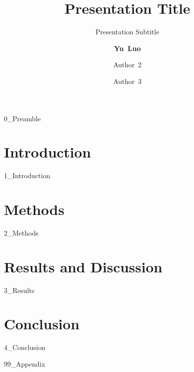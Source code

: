\documentclass[mathserif,aspectratio=169
,handout
]{beamer}
\title[Conference Name, Location] %
{{\bf Presentation Title}}
\subtitle{\footnotesize Presentation Subtitle}
\author[Luo, et al.] %
{{\bf Yu~Luo}\inst{1} 
\and Author~2\inst{2} \and Author~3\inst{1}\inst{2}
}
\institute[University of Delaware] %
{
  \inst{1}%
  Institution 1%
  \and
  \inst{2}%
  Institution 2%
}
\date[Date] %
{Conference Name \rule[-0.4ex]{0.2ex}{1.2em} 
Date \rule[-0.4ex]{0.2ex}{1.2em} 
Location}
\begin{document}
\frame{\titlepage}

{0_Preamble}
\placelogofalse

\section{Introduction}
{1_Introduction}

\section{Methods}
{2_Methods}

\section{Results and Discussion}
{3_Results}

\section{Conclusion}
{4_Conclusion}

\placelogofalse
\appendix
{99_Appendix}
\end{document}
